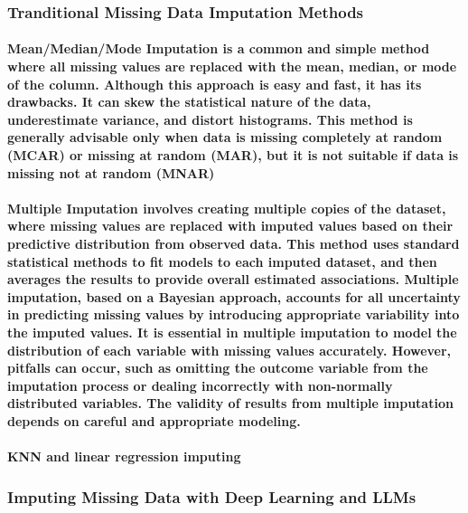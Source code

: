 \documentclass[11pt]{article} %
\begin{document}
\subsubsection{Tranditional Missing Data Imputation Methods}
% 
% 
% 
\paragraph{\textbf{Mean/Median/Mode Imputation} \cite{Kleinbort2020} is a common and simple method where all missing values are replaced with the mean, median, or mode of the column. Although this approach is easy and fast, it has its drawbacks. It can skew the statistical nature of the data, underestimate variance, and distort histograms. This method is generally advisable only when data is missing completely at random (MCAR) or missing at random (MAR), but it is not suitable if data is missing not at random (MNAR)}
% 
% 
% 
\paragraph{\textbf{Multiple Imputation} \cite{Sterneb2393} \cite{Khan2020} involves creating multiple copies of the dataset, where missing values are replaced with imputed values based on their predictive distribution from observed data. This method uses standard statistical methods to fit models to each imputed dataset, and then averages the results to provide overall estimated associations. Multiple imputation, based on a Bayesian approach, accounts for all uncertainty in predicting missing values by introducing appropriate variability into the imputed values. It is essential in multiple imputation to model the distribution of each variable with missing values accurately. However, pitfalls can occur, such as omitting the outcome variable from the imputation process or dealing incorrectly with non-normally distributed variables. The validity of results from multiple imputation depends on careful and appropriate modeling.}
% 
% 
% 
% 
% 
\paragraph{\textbf{KNN and linear regression imputing} \cite{10.1371/journal.pone.0295632} \cite{articleLearnKNN} \cite{inproceedingsKNearest} \cite{Emmanuel2021}}
% 
% 
% 
% 
% 
\subsubsection{Imputing Missing Data with Deep Learning and LLMs}
% 
% 
% 
% 
\end{document}
